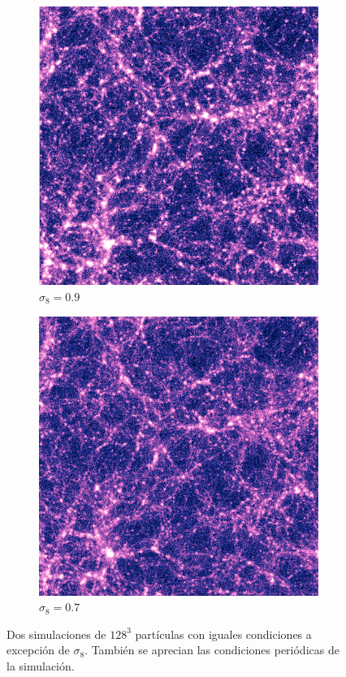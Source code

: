 \begin{figure}
	\centering
	\begin{subfigure}[b]{0.49\textwidth}
		\includegraphics[width=\textwidth]{Trabajo/res1}
		\caption{$\sigma_8=0.9$}
		\label{fig:sig9}
	\end{subfigure}
	\begin{subfigure}[b]{0.49\textwidth}
		\includegraphics[width=\textwidth]{Trabajo/res2}
		\caption{$\sigma_8=0.7$}
		\label{fig:sig7}
	\end{subfigure}
	\caption{Dos simulaciones de $128^3$ partículas con iguales condiciones a excepción de $\sigma_8$. También se aprecian las condiciones periódicas de la simulación.}
	\label{fig:sigma}
\end{figure}


